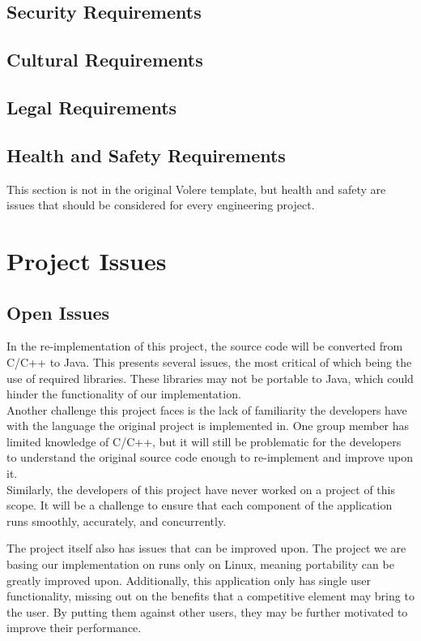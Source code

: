 \documentclass[12pt, titlepage]{article}
\begin{document}
\subsection{Security Requirements}

\subsection{Cultural Requirements}

\subsection{Legal Requirements}

\subsection{Health and Safety Requirements}

This section is not in the original Volere template, but health and safety are
issues that should be considered for every engineering project.

\section{Project Issues}
\subsection{Open Issues}
\indent \indent In the re-implementation of this project, the source code will be converted from C/C++ to Java. This presents several issues, the most critical of which being the use of required libraries. These libraries may not be portable to Java, which could hinder the functionality of our implementation. 
\\
\indent Another challenge this project faces is the lack of familiarity the developers have with the language the original project is implemented in. One group member has limited knowledge of C/C++, but it will still be problematic for the developers to understand the original source code enough to re-implement and improve upon it.
\\
\indent Similarly, the developers of this project have never worked on a project of this scope. It will be a challenge to ensure that each component of the application runs smoothly, accurately, and concurrently.

\indent The project itself also has issues that can be improved upon. The project we are basing our implementation on runs only on Linux, meaning portability can be greatly improved upon. Additionally, this application only has single user functionality, missing out on the benefits that a competitive element may bring to the user. By putting them against other users, they may be further motivated to improve their performance.
\end{document}

